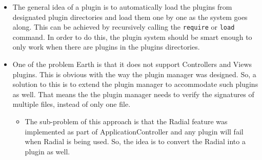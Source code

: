 \documentclass{article}
\begin{document}
\begin{itemize}
	\item The general idea of a plugin is to automatically load the plugins from designated plugin directories and load them one by one as the system goes along. This can be achieved by recursively calling the \texttt{require} or \texttt{load} command. In order to do this, the plugin system should be smart enough to only work when there are plugins in the plugins directories. 
	\item One of the problem Earth is that it does not support Controllers and Views plugins. This is obvious with the way the plugin manager was designed. So, a solution to this is to extend the plugin manager to accommodate such plugins as well. That means the the plugin manager needs to verify the signatures of multiple files, instead of only one file. 
		\begin{itemize}
			\item The sub-problem of this approach is that the Radial feature was implemented as part of ApplicationController and any plugin will fail when Radial is being used. So, the idea is to convert the Radial into a plugin as well. 
		\end{itemize}
\end{itemize}
\end{document}
